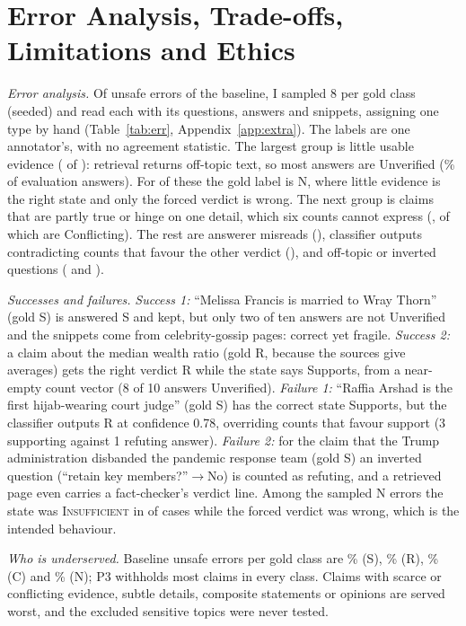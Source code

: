 \documentclass[acmlarge]{acmart}
\newcommand{\evs}[1]{\textsc{#1}}
\newcommand{\runin}[1]{\par\addvspace{4pt}\noindent\hspace{\parindent}\textit{#1}\hspace{0.45em}\ignorespaces}
\begin{document}
\section{Error Analysis, Trade-offs, Limitations and Ethics}\label{sec:limits}
\runin{Error analysis.} Of \unsafeErrTotal{} unsafe errors of the baseline, I sampled 8 per gold class (seeded) and read each with its questions, answers and snippets, assigning one type by hand (Table~\ref{tab:err}, Appendix~\ref{app:extra}). The labels are one annotator's, with no agreement statistic. The largest group is little usable evidence (\taxEv{} of \taxTotal{}): retrieval returns off-topic text, so most answers are Unverified (\unvPool\% of evaluation answers). For \taxEvGoldN{} of these the gold label is N, where little evidence is the right state and only the forced verdict is wrong. The next group is claims that are partly true or hinge on one detail, which six counts cannot express (\taxNua{}, of which \taxNuaGoldC{} are Conflicting). The rest are answerer misreads (\taxMis{}), classifier outputs contradicting counts that favour the other verdict (\taxClf{}), and off-topic or inverted questions (\taxDec{} and \taxPol{}).

\runin{Successes and failures.} \emph{Success 1:} ``Melissa Francis is married to Wray Thorn'' (gold S) is answered S and kept, but only two of ten answers are not Unverified and the snippets come from celebrity-gossip pages: correct yet fragile. \emph{Success 2:} a claim about the median wealth ratio (gold R, because the sources give averages) gets the right verdict R while the state says Supports, from a near-empty count vector (8 of 10 answers Unverified). \emph{Failure 1:} ``Raffia Arshad is the first hijab-wearing court judge'' (gold S) has the correct state Supports, but the classifier outputs R at confidence 0.78, overriding counts that favour support (3 supporting against 1 refuting answer). \emph{Failure 2:} for the claim that the Trump administration disbanded the pandemic response team (gold S) an inverted question (``retain key members?''$\to$No) is counted as refuting, and a retrieved page even carries a fact-checker's verdict line. Among the sampled N errors the state was \evs{Insufficient} in \nSampledNIns{} of \nSampledN{} cases while the forced verdict was wrong, which is the intended behaviour.

\runin{Who is underserved.} Baseline unsafe errors per gold class are \unsafeZeroS\% (S), \unsafeZeroR\% (R), \unsafeZeroC\% (C) and \unsafeZeroN\% (N); P3 withholds most claims in every class. Claims with scarce or conflicting evidence, subtle details, composite statements or opinions are served worst, and the excluded sensitive topics were never tested.
\end{document}
